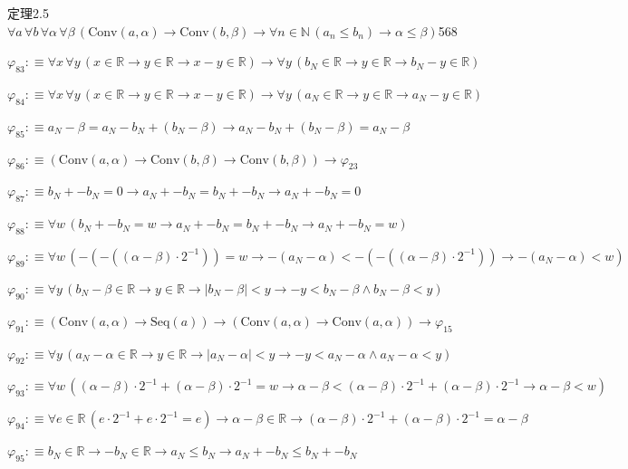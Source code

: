 \begin{fullproof}{定理2.5}{$\forall a\,\forall b\,\forall \alpha\,\forall \beta\,(\mathrm{Conv}(a,\alpha) \to \mathrm{Conv}(b,\beta) \to \forall n \in \mathbb{N}\,(a_{n} \leq b_{n}) \to \alpha \leq \beta)$}{568}
\begin{abbrevlist}
\item $\varphi_{83} :\equiv \forall x\,\forall y\,(x \in \mathbb{R} \to y \in \mathbb{R} \to x - y \in \mathbb{R}) \to \forall y\,(b_{N} \in \mathbb{R} \to y \in \mathbb{R} \to b_{N} - y \in \mathbb{R})$
\item $\varphi_{84} :\equiv \forall x\,\forall y\,(x \in \mathbb{R} \to y \in \mathbb{R} \to x - y \in \mathbb{R}) \to \forall y\,(a_{N} \in \mathbb{R} \to y \in \mathbb{R} \to a_{N} - y \in \mathbb{R})$
\item $\varphi_{85} :\equiv a_{N} - \beta = a_{N} - b_{N} + (b_{N} - \beta) \to a_{N} - b_{N} + (b_{N} - \beta) = a_{N} - \beta$
\item $\varphi_{86} :\equiv (\mathrm{Conv}(a,\alpha) \to \mathrm{Conv}(b,\beta) \to \mathrm{Conv}(b,\beta)) \to \varphi_{23}$
\item $\varphi_{87} :\equiv b_{N} + -b_{N} = 0 \to a_{N} + -b_{N} = b_{N} + -b_{N} \to a_{N} + -b_{N} = 0$
\item $\varphi_{88} :\equiv \forall w\,(b_{N} + -b_{N} = w \to a_{N} + -b_{N} = b_{N} + -b_{N} \to a_{N} + -b_{N} = w)$
\item $\varphi_{89} :\equiv \forall w\,(-(-((\alpha - \beta) \cdot 2^{-1})) = w \to -(a_{N} - \alpha) < -(-((\alpha - \beta) \cdot 2^{-1})) \to -(a_{N} - \alpha) < w)$
\item $\varphi_{90} :\equiv \forall y\,(b_{N} - \beta \in \mathbb{R} \to y \in \mathbb{R} \to \lvert b_{N} - \beta \rvert < y \to -y < b_{N} - \beta \land b_{N} - \beta < y)$
\item $\varphi_{91} :\equiv (\mathrm{Conv}(a,\alpha) \to \mathrm{Seq}(a)) \to (\mathrm{Conv}(a,\alpha) \to \mathrm{Conv}(a,\alpha)) \to \varphi_{15}$
\item $\varphi_{92} :\equiv \forall y\,(a_{N} - \alpha \in \mathbb{R} \to y \in \mathbb{R} \to \lvert a_{N} - \alpha \rvert < y \to -y < a_{N} - \alpha \land a_{N} - \alpha < y)$
\item $\varphi_{93} :\equiv \forall w\,((\alpha - \beta) \cdot 2^{-1} + (\alpha - \beta) \cdot 2^{-1} = w \to \alpha - \beta < (\alpha - \beta) \cdot 2^{-1} + (\alpha - \beta) \cdot 2^{-1} \to \alpha - \beta < w)$
\item $\varphi_{94} :\equiv \forall e \in \mathbb{R}\,(e \cdot 2^{-1} + e \cdot 2^{-1} = e) \to \alpha - \beta \in \mathbb{R} \to (\alpha - \beta) \cdot 2^{-1} + (\alpha - \beta) \cdot 2^{-1} = \alpha - \beta$
\item $\varphi_{95} :\equiv b_{N} \in \mathbb{R} \to -b_{N} \in \mathbb{R} \to a_{N} \leq b_{N} \to a_{N} + -b_{N} \leq b_{N} + -b_{N}$

\end{abbrevlist}
\end{fullproof}
